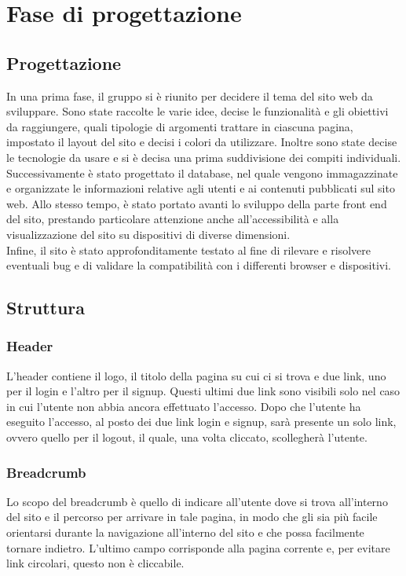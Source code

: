 \section{Fase di progettazione}
\subsection{Progettazione}
In una prima fase, il gruppo si è riunito per decidere il tema del sito web da sviluppare. Sono state raccolte le varie idee, decise le funzionalità e gli obiettivi da raggiungere, quali tipologie di argomenti trattare in ciascuna pagina, impostato il layout del sito e decisi i colori da utilizzare. Inoltre sono state decise le tecnologie da usare e si è decisa una prima suddivisione dei compiti individuali. \\
Successivamente è stato progettato il database, nel quale vengono immagazzinate e organizzate le informazioni relative agli utenti e ai contenuti pubblicati sul sito web. Allo stesso tempo, è stato portato avanti lo sviluppo della parte front end del sito, prestando particolare attenzione anche all'accessibilità e alla visualizzazione del sito su dispositivi di diverse dimensioni. \\
Infine, il sito è stato approfonditamente testato al fine di rilevare e risolvere eventuali bug e di validare la compatibilità con i differenti browser e dispositivi.
\subsection{Struttura}
\subsubsection{Header}
L'header contiene il logo, il titolo della pagina su cui ci si trova e due link, uno per il login e l'altro per il signup. Questi ultimi due link sono visibili solo nel caso in cui l'utente non abbia ancora effettuato l'accesso. Dopo che l'utente ha eseguito l'accesso, al posto dei due link login e signup, sarà presente un solo link, ovvero quello per il logout, il quale, una volta cliccato, scollegherà l'utente. 
\subsubsection{Breadcrumb}
Lo scopo del breadcrumb è quello di indicare all'utente dove si trova all'interno del sito e il percorso per arrivare in tale pagina, in modo che gli sia più facile orientarsi durante la navigazione all'interno del sito e che possa facilmente tornare indietro. L'ultimo campo corrisponde alla pagina corrente e, per evitare link circolari, questo non è cliccabile.
